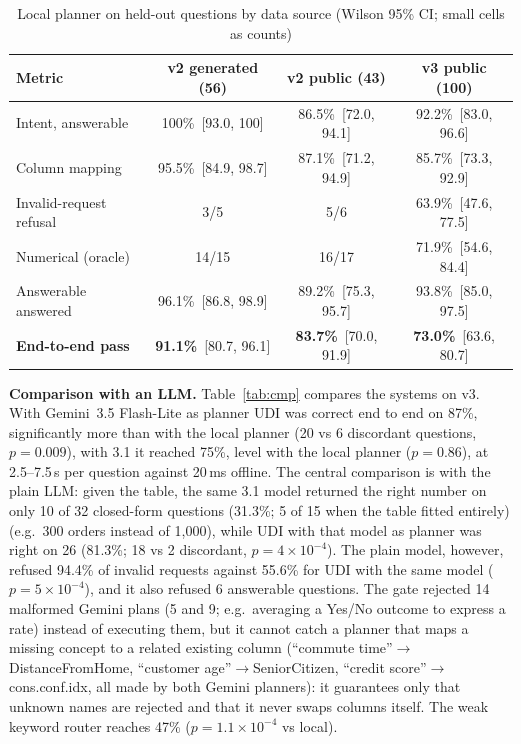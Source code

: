 \documentclass[conference]{IEEEtran}
\newcommand{\ci}[2]{\,{\scriptsize[#1, #2]}}
\begin{document}
\begin{table}[t]
\caption{Local planner on held-out questions by data source (Wilson 95\% CI; small cells as counts)}
\label{tab:bench}
\centering\scriptsize
\setlength{\tabcolsep}{2.5pt}
\begin{tabular}{lccc}
\toprule
Metric & v2 generated (56) & v2 public (43) & v3 public (100)\\
\midrule
Intent, answerable & 100\% \ci{93.0}{100} & 86.5\% \ci{72.0}{94.1} & 92.2\% \ci{83.0}{96.6}\\
Column mapping & 95.5\% \ci{84.9}{98.7} & 87.1\% \ci{71.2}{94.9} & 85.7\% \ci{73.3}{92.9}\\
Invalid-request refusal & 3/5 & 5/6 & 63.9\% \ci{47.6}{77.5}\\
Numerical (oracle) & 14/15 & 16/17 & 71.9\% \ci{54.6}{84.4}\\
Answerable answered & 96.1\% \ci{86.8}{98.9} & 89.2\% \ci{75.3}{95.7} & 93.8\% \ci{85.0}{97.5}\\
\textbf{End-to-end pass} & \textbf{91.1\%} \ci{80.7}{96.1} & \textbf{83.7\%} \ci{70.0}{91.9} & \textbf{73.0\%} \ci{63.6}{80.7}\\
\bottomrule
\end{tabular}
\end{table}

\textbf{Comparison with an LLM.} Table~\ref{tab:cmp} compares the systems on v3. With Gemini~3.5 Flash-Lite as planner UDI was correct end to end on 87\%, significantly more than with the local planner (20 vs 6 discordant questions, $p=0.009$), with 3.1 it reached 75\%, level with the local planner ($p=0.86$), at 2.5--7.5\,s per question against 20\,ms offline. The central comparison is with the plain LLM: given the table, the same 3.1 model returned the right number on only 10 of 32 closed-form questions (31.3\%; 5 of 15 when the table fitted entirely) (e.g.\ 300 orders instead of 1,000), while UDI with that model as planner was right on 26 (81.3\%; 18 vs 2 discordant, $p=4\times10^{-4}$). The plain model, however, refused 94.4\% of invalid requests against 55.6\% for UDI with the same model ($p=5\times10^{-4}$), and it also refused 6 answerable questions. The gate rejected 14 malformed Gemini plans (5 and 9; e.g.\ averaging a Yes/No outcome to express a rate) instead of executing them, but it cannot catch a planner that maps a missing concept to a related existing column (``commute time''$\to$DistanceFromHome, ``customer age''$\to$SeniorCitizen, ``credit score''$\to$cons.conf.idx, all made by both Gemini planners): it guarantees only that unknown names are rejected and that it never swaps columns itself. The weak keyword router reaches 47\% ($p=1.1\times10^{-4}$ vs local).
\end{document}
